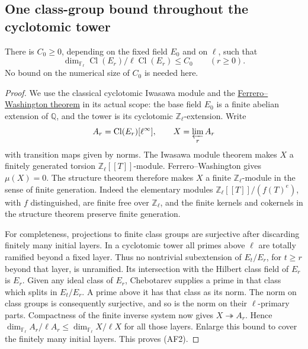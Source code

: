 \subsection{One class-group bound throughout the cyclotomic tower}
\begin{srlemma}\label{lem:frame-class-rank-uniform}
There is \(C_0\ge0\), depending on the fixed field \(E_0\)
and on \(\ell\), such that
\[
       \dim_{\mathbb F_\ell}
             \operatorname{Cl}(E_r)/\ell\operatorname{Cl}(E_r)
                                      \le C_0
                         \qquad(r\ge0).                       \tag{AF2}
\]
No bound on the numerical size of \(C_0\) is needed here.
\end{srlemma}
\begin{proof}
We use the classical cyclotomic Iwasawa module and the
\href{https://doi.org/10.2307/1971116}
{Ferrero--Washington theorem} in its actual scope:
the base field \(E_0\) is a finite abelian extension of
\(\mathbb Q\), and the tower is its cyclotomic
\(\mathbb Z_\ell\)-extension.
Write
\[
 A_r=\operatorname{Cl}(E_r)[\ell^\infty],
       \qquad X=\varprojlim_r A_r
\]
with transition maps given by norms.
The Iwasawa module theorem makes \(X\) a finitely
generated torsion \(\mathbb Z_\ell[[T]]\)-module.
Ferrero--Washington gives \(\mu(X)=0\).
The structure theorem therefore makes \(X\) a finite
\(\mathbb Z_\ell\)-module in the sense of finite generation.
Indeed the elementary modules
\(\mathbb Z_\ell[[T]]/(f(T)^e)\), with \(f\) distinguished,
are finite free over \(\mathbb Z_\ell\), and the finite
kernels and cokernels in the structure theorem preserve
finite generation.

For completeness, projections to finite class groups
are surjective after discarding finitely many initial
layers.
In a cyclotomic tower all primes above \(\ell\) are
totally ramified beyond a fixed layer.
Thus no nontrivial subextension of \(E_t/E_r\), for
\(t\ge r\) beyond that layer, is unramified.
Its intersection with the Hilbert class field of \(E_r\)
is \(E_r\).
Given any ideal class of \(E_r\), Chebotarev supplies a
prime in that class which splits in \(E_t/E_r\).
A prime above it has that class as its norm.
The norm on class groups is consequently surjective,
and so is the norm on their \(\ell\)-primary parts.
Compactness of the finite inverse system now gives
\(X\twoheadrightarrow A_r\).
Hence
\(\dim_{\mathbb F_\ell}A_r/\ell A_r
 \le\dim_{\mathbb F_\ell}X/\ell X\)
for all those layers.
Enlarge this bound to cover the finitely many initial
layers.  This proves (AF2).
\end{proof}

